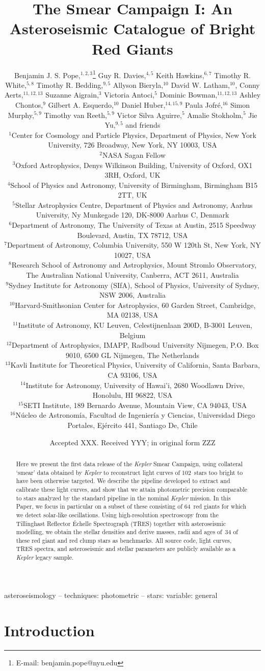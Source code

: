 \documentclass[a4paper,fleqn,usenatbib]{mnras}
\title[The Kepler Smear Campaign]{The \kepler Smear Campaign I: An Asteroseismic Catalogue of Bright Red Giants}
\author[B. J. S. Pope et al.]{Benjamin J. S. Pope,$^{1,2,3}$\thanks{E-mail: benjamin.pope@nyu.edu}
Guy R. Davies,$^{4,5}$
Keith Hawkins,$^{6,7}$
Timothy R. White,$^{5,8}$\newauthor
Timothy R. Bedding,$^{9,5}$
Allyson Bieryla,$^{10}$
David W. Latham,$^{10}$,
Conny Aerts,$^{11,12,13}$\newauthor
Suzanne Aigrain,$^{3}$ 
Victoria Antoci,$^{5}$
Dominic Bowman,$^{11,12,13}$
Ashley Chontos,$^{9}$\newauthor
Gilbert A. Esquerdo,$^{10}$
Daniel Huber,$^{14,15,9}$
Paula Jofr\'{e},$^{16}$
Simon Murphy,$^{5,9}$\newauthor
Timothy van Reeth,$^{5,9}$
Victor Silva Aguirre,$^{5}$
Amalie Stokholm,$^{5}$
Jie Yu,$^{9,5}$ \newauthor
and friends
\\
$^{1}$Center for Cosmology and Particle Physics, Department of Physics, New York University, 726 Broadway, New York, NY 10003, USA\\
$^{2}$NASA Sagan Fellow\\
$^{3}$Oxford Astrophysics, Denys Wilkinson Building, University of Oxford, OX1 3RH, Oxford, UK\\
$^{4}$School of Physics and Astronomy, University of Birmingham, Birmingham B15 2TT, UK\\
$^{5}$Stellar Astrophysics Centre, Department of Physics and Astronomy, Aarhus University, Ny Munkegade 120, DK-8000 Aarhus C, Denmark\\
$^{6}$Department of Astronomy, The University of Texas at Austin, 2515 Speedway Boulevard, Austin, TX 78712, USA\\
$^{7}$Department of Astronomy, Columbia University, 550 W 120th St, New York, NY 10027, USA\\
$^{8}$Research School of Astronomy and Astrophysics, Mount Stromlo Observatory, The Australian National University, Canberra, ACT 2611, Australia\\
$^{9}$Sydney Institute for Astronomy (SIfA), School of Physics, University of Sydney, NSW 2006, Australia\\
$^{10}$Harvard-Smithsonian Center for Astrophysics, 60 Garden Street, Cambridge, MA 02138, USA\\
$^{11}$Institute of Astronomy, KU Leuven, Celestijnenlaan 200D, B-3001 Leuven, Belgium\\
$^{12}$Department of Astrophysics, IMAPP, Radboud University Nijmegen, P.O. Box 9010, 6500 GL Nijmegen, The Netherlands\\
$^{13}$Kavli Institute for Theoretical Physics, University of California, Santa Barbara, CA 93106, USA\\
$^{14}$Institute for Astronomy, University of Hawai'i, 2680 Woodlawn Drive, Honolulu, HI 96822, USA\\
$^{15}$SETI Institute, 189 Bernardo Avenue, Mountain View, CA 94043, USA\\
$^{16}$N\'{u}cleo de Astronom\'{i}a, Facultad de Ingenier\'{i}a y Ciencias, Universidad Diego Portales, Ej\'{e}rcito 441, Santiago De, Chile\\
}
\date{Accepted XXX. Received YYY; in original form ZZZ}
\newcommand{\kepler}{\emph{Kepler}\xspace}
\begin{document}
\label{firstpage}
\pagerange{\pageref{firstpage}--\pageref{lastpage}}
\maketitle

\begin{abstract}
Here we present the first data release of the \kepler Smear Campaign, using collateral `smear' data obtained by \kepler to reconstruct light curves of 102~stars too bright to have been otherwise targeted. We describe the pipeline developed to extract and calibrate these light curves, and show that we attain photometric precision comparable to stars analyzed by the standard pipeline in the nominal \kepler mission. In this Paper, we focus in particular on a subset of these consisting of 64~red giants for which we detect solar-like oscillations. Using high-resolution spectroscopy from the Tillinghast Reflector \'{E}chelle Spectrograph (TRES) together with asteroseismic modelling, we obtain the stellar densities and derive masses, radii and ages of~34 of these red giant and red clump stars as benchmarks. All source code, light curves, TRES spectra, and asteroseismic and stellar parameters are publicly available as a \kepler legacy sample.
\end{abstract}

\begin{keywords}
asteroseismology -- techniques: photometric -- stars: variable: general
\end{keywords}



\section{Introduction}
\label{intro}

\end{document}
